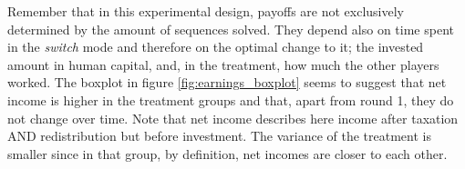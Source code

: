 \begin{table}[!htbp] \centering 
  \caption{Linear Mixed Model - Sequence Production} 
  \label{table:lmer_prod} 
\end{table} 

Remember that in this experimental design, payoffs are not exclusively determined by the amount of sequences solved. They depend also on time spent in the \textit{switch} mode and therefore on the optimal change to it; the invested amount in human capital, and, in the treatment, how much the other players worked. The boxplot in figure \ref{fig:earnings_boxplot} seems to suggest that net income is higher in the treatment groups and that, apart from round 1, they do not change over time. Note that net income describes here income after taxation AND redistribution but before investment. The variance of the treatment is smaller since in that group, by definition, net incomes are closer to each other.\\

